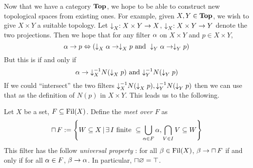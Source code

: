 \documentclass[main.tex]{subfiles}
\begin{document}
\begin{rmk}[Motivation]
  
  Now that we have a category $\TOP$, 
  we hope to be able to construct new topological spaces from 
  existing ones. 
  For example, given $X, Y \in \TOP$,
  we wish to give $X\times Y$ a suitable topology. 
  Let $\fall{}{X} : X\times Y \to X$, $\fall{}{X} : X \times Y \to Y$
  denote the two projections. 
  Then we hope that for any filter $\al$ on $X\times Y$ and $p \in X\times Y$,
  \[
    \al \to p \iff \brkt{\fall{}{X}\al \to \fall{}{X}p \text{ and } 
    \fall{}{Y} \al \to \fall{}{Y} p}
  \]
  But this is if and only if \[
    \al \to {\fall{-1}{X}} N(\fall{}{X}p) \text{ and }
    {\fall{-1}{Y}} N(\fall{}{Y} p)
  \]
  If we could ``intersect'' the two filters 
  ${\fall{-1}{X}} N(\fall{}{X}p),
  {\fall{-1}{Y}} N(\fall{}{Y} p)$ then we can use that as
  the definition of $N(p)$ in $X\times Y$.
  This leads us to the following. 
\end{rmk}

\begin{dfn}
  
  Let $X$ be a set, $F \subs \fil(X)$.
  Define the \emph{meet over $F$} as 
  \[
    \sqcap\, F := \set{
      W \subs X \st \exists\, I\text{ finite } \subs \bigcup_{\al \in F}\al,
      \bigcap_{V \in I} V \subs W
    }
  \]
  This filter has the follow \emph{universal property} : 
  for all $\be \in \fil(X)$,
  $\be \to \sqcap\, F$ if and only if 
  for all $\al \in F$, $\be \to \al$.
  In particular, $\sqcap \nothing = \top$.
\end{dfn}
\end{document}
